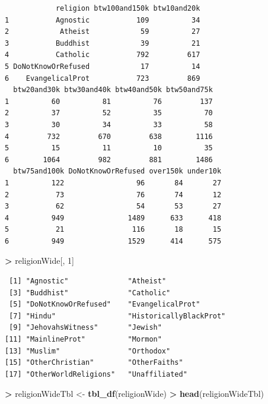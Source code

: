 \documentclass[]{krantz}
\makeatletter
\newenvironment{Shaded}{\begin{snugshade}}{\end{snugshade}}
\newcommand{\DecValTok}[1]{\textcolor[rgb]{0.06,0.06,0.06}{#1}}
\newcommand{\KeywordTok}[1]{\textcolor[rgb]{0.27,0.27,0.27}{\textbf{#1}}}
\newcommand{\NormalTok}[1]{#1}
\newcommand{\OperatorTok}[1]{\textcolor[rgb]{0.43,0.43,0.43}{\textbf{#1}}}
\newcommand{\StringTok}[1]{\textcolor[rgb]{0.5,0.5,0.5}{#1}}
\newenvironment{kframe}{%
\medskip{}
\setlength{\fboxsep}{.8em}
 \def\at@end@of@kframe{}%
 \ifinner\ifhmode%
  \def\at@end@of@kframe{\end{minipage}}%
  \begin{minipage}{\columnwidth}%
 \fi\fi%
 \def\FrameCommand##1{\hskip\@totalleftmargin \hskip-\fboxsep
 \colorbox{shadecolor}{##1}\hskip-\fboxsep
     \hskip-\linewidth \hskip-\@totalleftmargin \hskip\columnwidth}%
 \MakeFramed {\advance\hsize-\width
   \@totalleftmargin\z@ \linewidth\hsize
   \@setminipage}}%
 {\par\unskip\endMakeFramed%
 \at@end@of@kframe}
\renewenvironment{Shaded}{\begin{kframe}}{\end{kframe}}
\makeatother
\begin{document}
\begin{verbatim}
            religion btw100and150k btw10and20k
1           Agnostic           109          34
2            Atheist            59          27
3           Buddhist            39          21
4           Catholic           792         617
5 DoNotKnowOrRefused            17          14
6    EvangelicalProt           723         869
  btw20and30k btw30and40k btw40and50k btw50and75k
1          60          81          76         137
2          37          52          35          70
3          30          34          33          58
4         732         670         638        1116
5          15          11          10          35
6        1064         982         881        1486
  btw75and100k DoNotKnowOrRefused over150k under10k
1          122                 96       84       27
2           73                 76       74       12
3           62                 54       53       27
4          949               1489      633      418
5           21                116       18       15
6          949               1529      414      575
\end{verbatim}

\begin{Shaded}
\begin{Highlighting}[]
\OperatorTok{>}\StringTok{ }\NormalTok{religionWide[, }\DecValTok{1}\NormalTok{]}
\end{Highlighting}
\end{Shaded}

\begin{verbatim}
 [1] "Agnostic"              "Atheist"              
 [3] "Buddhist"              "Catholic"             
 [5] "DoNotKnowOrRefused"    "EvangelicalProt"      
 [7] "Hindu"                 "HistoricallyBlackProt"
 [9] "JehovahsWitness"       "Jewish"               
[11] "MainlineProt"          "Mormon"               
[13] "Muslim"                "Orthodox"             
[15] "OtherChristian"        "OtherFaiths"          
[17] "OtherWorldReligions"   "Unaffiliated"         
\end{verbatim}

\begin{Shaded}
\begin{Highlighting}[]
\OperatorTok{>}\StringTok{ }\NormalTok{religionWideTbl <-}\StringTok{ }\KeywordTok{tbl_df}\NormalTok{(religionWide)}
\OperatorTok{>}\StringTok{ }\KeywordTok{head}\NormalTok{(religionWideTbl)}
\end{Highlighting}
\end{Shaded}
\end{document}
